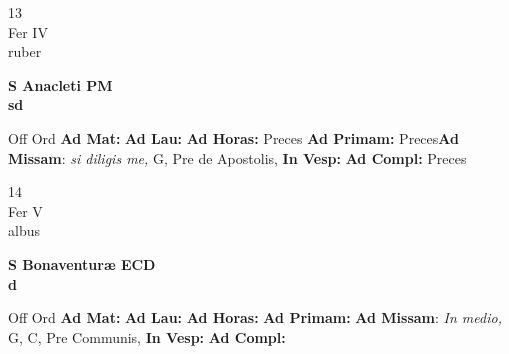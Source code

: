\documentclass[10pt, openany]{book}
\begin{document}
    \begin{center}
        \begin{minipage}{3.5in}
            \vspace{2em}
            \begin{minipage}{0.5in}
                {\Huge 13} \\
                {\normalsize Fer IV} \\
                {\normalsize ruber}
            \end{minipage}
            \begin{minipage}{3.0in}
                \textbf{ \large S Anacleti PM \\
                \textnormal{\normalsize sd}} \\ 
            \end{minipage}
            \begin{justify}Off Ord
                \textbf{Ad Mat: }
                \textbf{Ad Lau: }
                \textbf{Ad Horas: }Preces
                \textbf{Ad Primam: }Preces\textbf{Ad Missam}: \textit{si diligis me,} G, Pre de Apostolis,  
                \textbf{In Vesp: }
                \textbf{Ad Compl: }Preces
            \end{justify}
        \end{minipage}
    \end{center}

    \begin{center}
        \begin{minipage}{3.5in}
            \vspace{2em}
            \begin{minipage}{0.5in}
                {\Huge 14} \\
                {\normalsize Fer V} \\
                {\normalsize albus}
            \end{minipage}
            \begin{minipage}{3.0in}
                \textbf{ \large S Bonaventuræ ECD \\
                \textnormal{\normalsize d}} \\ 
            \end{minipage}
            \begin{justify}Off Ord
                \textbf{Ad Mat: }
                \textbf{Ad Lau: }
                \textbf{Ad Horas: }
                \textbf{Ad Primam: }\textbf{Ad Missam}: \textit{In medio,} G, C, Pre Communis,  
                \textbf{In Vesp: }
                \textbf{Ad Compl: }
            \end{justify}
        \end{minipage}
    \end{center}
\end{document}
